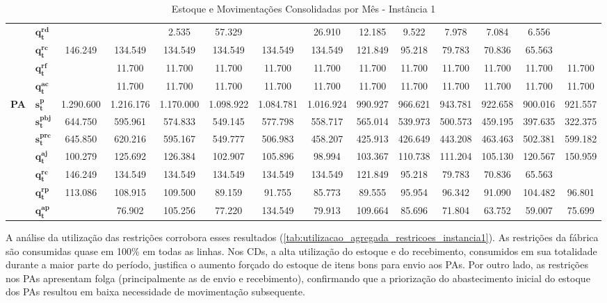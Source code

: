 \begin{table}
{\begin{tabular}{|l|l|c|c|c|c|c|c|c|c|c|c|c|c|}
& $\mathbf{q^{rd}_{t}}$ & & & 2.535 & 57.329 & & 26.910 & 12.185 & 9.522 & 7.978 & 7.084 & 6.556 & \\\cline{2-14}
& $\mathbf{q^{rc}_{t}}$ & 146.249 & 134.549 & 134.549 & 134.549 & 134.549 & 134.549 & 121.849 & 95.218 & 79.783 & 70.836 & 65.563 & \\\cline{2-14}
& $\mathbf{q^{rf}_{t}}$ & & 11.700 & 11.700 & 11.700 & 11.700 & 11.700 & 11.700 & 11.700 & 11.700 & 11.700 & 11.700 & 11.700 \\\cline{2-14}
& $\mathbf{q^{ac}_{t}}$ & & 11.700 & 11.700 & 11.700 & 11.700 & 11.700 & 11.700 & 11.700 & 11.700 & 11.700 & 11.700 & 11.700 \\
\hline
\multirow{7}{*}{\textbf{PA}} & $\mathbf{s^{p}_{t}}$ & 1.290.600 & 1.216.176 & 1.170.000 & 1.098.922 & 1.084.781 & 1.016.924 & 990.927 & 966.621 & 943.781 & 922.658 & 900.016 & 921.557 \\\cline{2-14}
& $\mathbf{s^{pbj}_{t}}$ & 644.750 & 595.961 & 574.833 & 549.145 & 577.798 & 558.717 & 565.014 & 539.973 & 500.573 & 459.195 & 397.635 & 322.375 \\\cline{2-14}
& $\mathbf{s^{prc}_{t}}$ & 645.850 & 620.216 & 595.167 & 549.777 & 506.983 & 458.207 & 425.913 & 426.649 & 443.208 & 463.463 & 502.381 & 599.182 \\\cline{2-14}
& $\mathbf{q^{aj}_{t}}$ & 100.279 & 125.692 & 126.384 & 102.907 & 105.896 & 98.994 & 103.367 & 110.738 & 111.204 & 105.130 & 120.567 & 150.959 \\\cline{2-14}
& $\mathbf{q^{rc}_{t}}$ & 146.249 & 134.549 & 134.549 & 134.549 & 134.549 & 134.549 & 121.849 & 95.218 & 79.783 & 70.836 & 65.563 & \\\cline{2-14}
& $\mathbf{q^{rp}_{t}}$ & 113.086 & 108.915 & 109.500 & 89.159 & 91.755 & 85.773 & 89.555 & 95.954 & 96.342 & 91.090 & 104.482 & 96.801 \\\cline{2-14}
& $\mathbf{q^{ap}_{t}}$ & & 76.902 & 105.256 & 77.220 & 134.549 & 79.913 & 109.664 & 85.696 & 71.804 & 63.752 & 59.007 & 75.699 \\
\hline
\end{tabular}%
}
\caption{Estoque e Movimentações Consolidadas por Mês - Instância 1}
\label{tab:estoque_movimentacoes_consolidadas_instancia1}

\fdadospesquisa 
    
\end{table}


A análise da utilização das restrições corrobora esses resultados (\autoref{tab:utilizacao_agregada_restricoes_instancia1}). As restrições da fábrica são consumidas quase em 100\% em todas as linhas. Nos CDs, a alta utilização do estoque e do recebimento, consumidos em sua totalidade durante a maior parte do período, justifica o aumento forçado do estoque de itens bons para envio aos PAs. Por outro lado, as restrições nos PAs apresentam folga (principalmente as de envio e recebimento), confirmando que a priorização do abastecimento inicial do estoque dos PAs resultou em baixa necessidade de movimentação subsequente.

